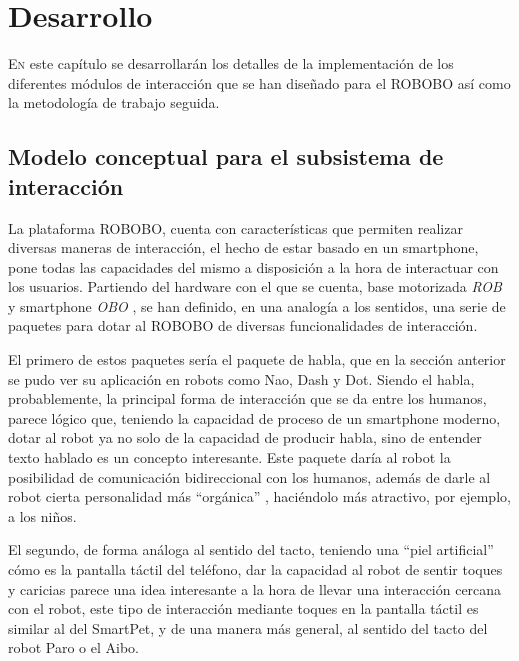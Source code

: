 
\chapter{Desarrollo}
\label{chap:desarrollo}
\vspace{0.5cm}

\lettrine{E}{n} este capítulo se desarrollarán los detalles de la implementación de los diferentes módulos de interacción que se han diseñado para el ROBOBO así como la metodología de trabajo seguida.

\section{Modelo conceptual para el subsistema de interacción}
 \label{sec:modelo-conceptual}
 
 La plataforma ROBOBO, cuenta con características que permiten realizar diversas maneras de interacción, el hecho de estar basado en un smartphone, pone todas las capacidades del mismo a disposición a la hora de interactuar con los usuarios. Partiendo del hardware con el que se cuenta, base motorizada \textit{ROB} y smartphone \textit{OBO} , se han definido, en una analogía a los sentidos, una serie de paquetes para dotar al ROBOBO de diversas funcionalidades de interacción.
 
 El primero de estos paquetes sería el paquete de habla, que en la sección anterior se pudo ver su aplicación en robots como Nao, Dash y Dot. Siendo el habla, probablemente, la principal forma de interacción que se da entre los humanos, parece lógico que, teniendo la capacidad de proceso de un smartphone moderno, dotar al robot ya no solo de la capacidad de producir habla, sino de entender texto hablado es un concepto interesante. Este paquete daría al robot la posibilidad de comunicación bidireccional con los humanos, además de darle al robot cierta personalidad más \enquote{orgánica} , haciéndolo más atractivo, por ejemplo, a los niños.
 
 El segundo, de forma análoga al sentido del tacto, teniendo una \enquote{piel artificial} cómo es la pantalla táctil del teléfono, dar la capacidad al robot de sentir toques y caricias parece una idea interesante a la hora de llevar una interacción cercana con el robot, este tipo de interacción mediante toques en la pantalla táctil es similar al del SmartPet, y de una manera más general, al sentido del tacto del robot Paro o el Aibo.
 

